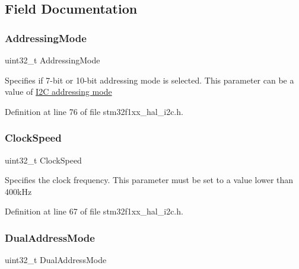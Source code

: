 \subsection{Field Documentation}
\mbox{\label{struct_i2_c___init_type_def_aa7afcb44ef1f351763d7dc69ba0f4f8c}} 
\subsubsection{\texorpdfstring{Addressing\+Mode}{AddressingMode}}
{\footnotesize\ttfamily uint32\+\_\+t Addressing\+Mode}

Specifies if 7-\/bit or 10-\/bit addressing mode is selected. This parameter can be a value of \hyperlink{group___i2_c__addressing__mode}{I2C addressing mode} 

Definition at line 76 of file stm32f1xx\+\_\+hal\+\_\+i2c.\+h.

\mbox{\label{struct_i2_c___init_type_def_a2e90d47d6a9a180f8c3126c70102d562}} 
\subsubsection{\texorpdfstring{Clock\+Speed}{ClockSpeed}}
{\footnotesize\ttfamily uint32\+\_\+t Clock\+Speed}

Specifies the clock frequency. This parameter must be set to a value lower than 400k\+Hz 

Definition at line 67 of file stm32f1xx\+\_\+hal\+\_\+i2c.\+h.

\mbox{\label{struct_i2_c___init_type_def_aabb4e156aa4af60dfaf591419e9b1a07}} 
\subsubsection{\texorpdfstring{Dual\+Address\+Mode}{DualAddressMode}}
{\footnotesize\ttfamily uint32\+\_\+t Dual\+Address\+Mode}

